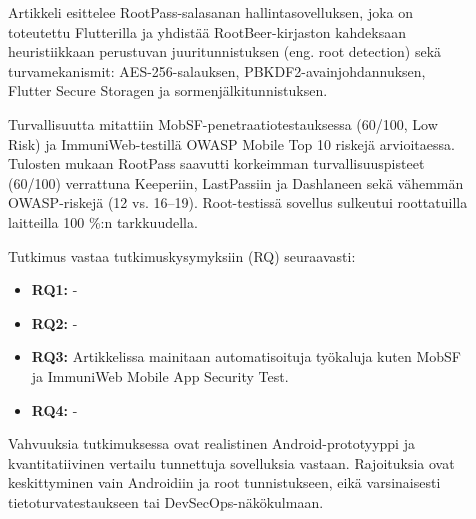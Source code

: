 \documentclass[bscthesis,finnish,oneside,biblatex]{uefcsthesis}
\begin{document}
    \begin{description}
        \item[\cite{mukti2023_passwordmanager}] Artikkeli esittelee RootPass-salasanan hallintasovelluksen, joka on toteutettu Flutterilla ja yhdistää RootBeer-kirjaston kahdeksaan heuristiikkaan perustuvan juuritunnistuksen (eng. root detection) sekä turvamekanismit: AES-256-salauksen, PBKDF2-avainjohdannuksen, Flutter Secure Storagen ja sormenjälkitunnistuksen.

        Turvallisuutta mitattiin MobSF-penetraatiotestauksessa (60/100, Low Risk) ja ImmuniWeb-testillä OWASP Mobile Top 10 riskejä arvioitaessa. Tulosten mukaan RootPass saavutti korkeimman turvallisuuspisteet (60/100) verrattuna Keeperiin, LastPassiin ja Dashlaneen sekä vähemmän OWASP-riskejä (12 vs. 16–19). Root-testissä sovellus sulkeutui roottatuilla laitteilla 100 \%:n tarkkuudella.

        Tutkimus vastaa tutkimuskysymyksiin (RQ) seuraavasti:
        \begin{itemize}
            \item \textbf{RQ1:} -
            \item \textbf{RQ2:} -
            \item \textbf{RQ3:} Artikkelissa mainitaan automatisoituja työkaluja kuten MobSF ja ImmuniWeb Mobile App Security Test.
            \item \textbf{RQ4:} -
        \end{itemize}

        Vahvuuksia tutkimuksessa ovat realistinen Android-prototyyppi ja kvantitatiivinen vertailu tunnettuja sovelluksia vastaan. Rajoituksia ovat keskittyminen vain Androidiin ja root tunnistukseen, eikä varsinaisesti tietoturvatestaukseen tai DevSecOps-näkökulmaan.
    \end{description}
\end{document}
